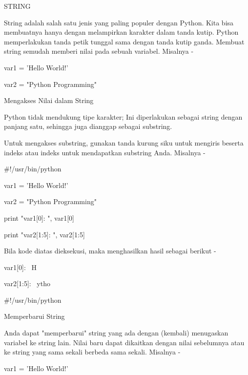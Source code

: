  
STRING \par
String adalah salah satu jenis yang paling populer dengan Python. Kita bisa membuatnya hanya dengan melampirkan karakter dalam tanda kutip. Python memperlakukan tanda petik tunggal sama dengan tanda kutip ganda. Membuat string semudah memberi nilai pada sebuah variabel. Misalnya - \par
\vspace{12pt}
var1 = 'Hello World!' \par
var2 = "Python Programming" \par
\vspace{12pt}
Mengakses Nilai dalam String \par
Python tidak mendukung tipe karakter; Ini diperlakukan sebagai string dengan panjang satu, sehingga juga dianggap sebagai substring. \par
Untuk mengakses substring, gunakan tanda kurung siku untuk mengiris beserta indeks atau indeks untuk mendapatkan substring Anda. Misalnya - \par
\vspace{12pt}
 $  \#  $!/usr/bin/python \par
\vspace{12pt}
var1 = 'Hello World!' \par
var2 = "Python Programming" \par
\vspace{12pt}
print "var1[0]: ", var1[0] \par
print "var2[1:5]: ", var2[1:5] \par
\vspace{12pt}
Bila kode diatas dieksekusi, maka menghasilkan hasil sebagai berikut - \par
\vspace{12pt}
var1[0]:~ H \par
var2[1:5]:~ ytho \par
\vspace{12pt}
 $  \#  $!/usr/bin/python \par
\vspace{12pt}
Memperbarui String \par
Anda dapat "memperbarui" string yang ada dengan (kembali) menugaskan variabel ke string lain. Nilai baru dapat dikaitkan dengan nilai sebelumnya atau ke string yang sama sekali berbeda sama sekali. Misalnya - \par
\vspace{12pt}
\vspace{12pt}
var1 = 'Hello World!' \par
